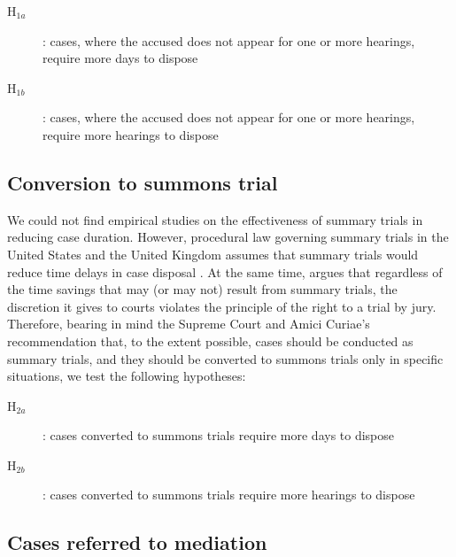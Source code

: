 \documentclass[12pt,a4paper]{article}
\begin{document}
\begin{description}
\item[H$_{1a}$]: cases, where the accused does not appear for one or more hearings, require more days to dispose
\item[H$_{1b}$]: cases, where the accused does not appear for one or more hearings, require more hearings to dispose
\end{description}

\subsection{Conversion to summons trial}
\label{sec:conv-summ-trial}

We could not find empirical studies on the effectiveness of summary trials in reducing case duration. However, procedural law governing summary trials in the United States and the United Kingdom assumes that summary trials would reduce time delays in case disposal \autocite{miller2003}. At the same time, \textcite{miller2003} argues that regardless of the time savings that may (or may not) result from summary trials, the discretion it gives to courts violates the principle of the right to a trial by jury. Therefore, bearing in mind the Supreme Court and Amici Curiae's recommendation that, to the extent possible, cases should be conducted as summary trials, and they should be converted to summons trials only in specific situations, we test the following hypotheses:

\begin{description}
\item[H$_{2a}$]: cases converted to summons trials require more days to dispose
\item[H$_{2b}$]: cases converted to summons trials require more hearings to dispose
\end{description}

\subsection{Cases referred to mediation} \label{sec:furth-exam-cases}
\end{document}
